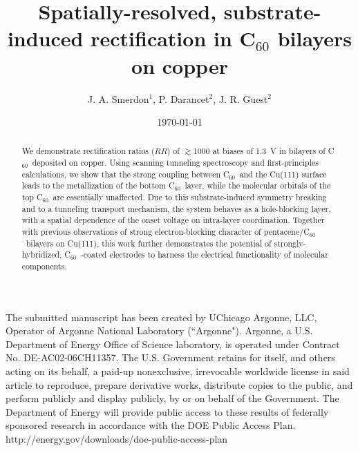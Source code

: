 \documentclass[11pt,showpacs,amsmath,amssymbl]{revtex4}
\newcommand{\buck}{C$_{60}$~}
\begin{document}
\title{Spatially-resolved, substrate-induced rectification in C$_{60}$ bilayers on copper}
\author{J. A. Smerdon$^1$, P. Darancet$^2$, J. R. Guest$^2$}


\date{\today}





\begin{abstract}
We demonstrate rectification ratios ($RR$) of $\gtrsim$1000 at biases of 1.3~V in bilayers of \buck deposited on copper.  Using scanning tunneling spectroscopy and first-principles calculations, we show that the strong coupling between \buck and the Cu(111) surface leads to the metallization of the bottom \buck layer, while the molecular orbitals of the top \buck are essentially unaffected.  Due to this substrate-induced symmetry breaking and to a tunneling transport mechanism, the system behaves as a hole-blocking layer, with a spatial dependence of the onset voltage on intra-layer coordination. Together with previous observations of strong electron-blocking character of pentacene/\buck bilayers on Cu(111), this work further demonstrates the potential of strongly-hybridized, \buck-coated electrodes to harness the electrical functionality of molecular components. 
\end{abstract}



\maketitle

The submitted manuscript has been created by UChicago Argonne, LLC, Operator of Argonne National Laboratory (``Argonne"). Argonne, a U.S. Department of Energy Office of Science
laboratory, is operated under Contract No. DE-AC02-06CH11357. The U.S. Government retains for itself, and others acting on its behalf, a paid-up nonexclusive, irrevocable worldwide
license in said article to reproduce, prepare derivative works, distribute copies to the public, and perform publicly and display publicly, by or on behalf of the Government. The Department
of Energy will provide public access to these results of federally sponsored research in accordance with the DOE Public Access Plan. http://energy.gov/downloads/doe-public-access-plan
\end{document}
